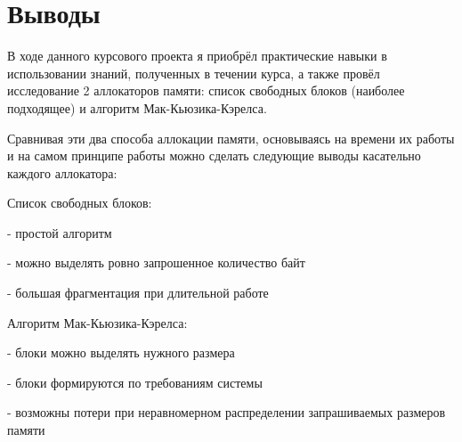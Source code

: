\documentclass[a4paper, 12pt]{article}
\begin{document}
\newpage
\section{Выводы}

В ходе данного курсового проекта я приобрёл практические навыки в использовании знаний,
полученных в течении курса, а также провёл исследование 2 аллокаторов памяти: 
список свободных блоков (наиболее подходящее) и алгоритм Мак-Кьюзика-Кэрелса.

Сравнивая эти два способа аллокации памяти, основываясь на времени их работы и 
на самом принципе работы можно сделать следующие выводы касательно каждого аллокатора:

Список свободных блоков:

 - простой алгоритм

 - можно выделять ровно запрошенное количество байт

 - большая фрагментация при длительной работе

Алгоритм Мак-Кьюзика-Кэрелса:

 - блоки можно выделять нужного размера

 - блоки формируются по требованиям системы

 - возможны потери при неравномерном распределении запрашиваемых размеров памяти
\end{document}
